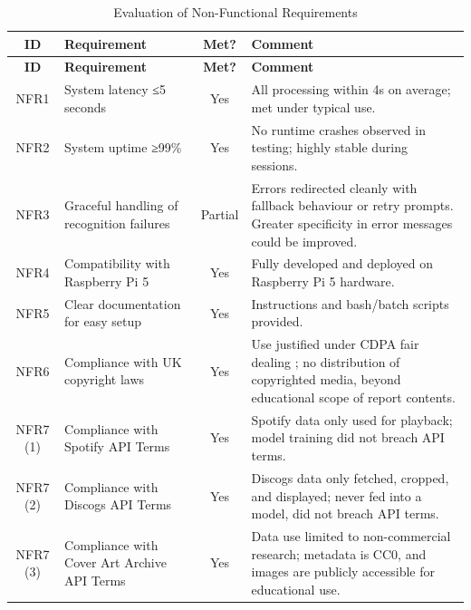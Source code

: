         \begin{longtable}{|c|p{5cm}|c|p{5cm}|}
            \caption{Evaluation of Non-Functional Requirements} \label{tab:NFR}\\
            \hline
            \textbf{ID} & \textbf{Requirement} & \textbf{Met?} & \textbf{Comment} \\
            \hline
            \endfirsthead
            \hline
            \textbf{ID} & \textbf{Requirement} & \textbf{Met?} & \textbf{Comment} \\
            \hline
            \endhead
            NFR1 & System latency ≤5 seconds & Yes & All processing within 4s on average; met under typical use. \\
            \hline
            NFR2 & System uptime ≥99\% & Yes & No runtime crashes observed in testing; highly stable during sessions. \\
            \hline
            NFR3 & Graceful handling of recognition failures & Partial & Errors redirected cleanly with fallback behaviour or retry prompts. Greater specificity in error messages could be improved. \\
            \hline
            NFR4 & Compatibility with Raspberry Pi 5 & Yes & Fully developed and deployed on Raspberry Pi 5 hardware. \\
            \hline
            NFR5 & Clear documentation for easy setup & Yes & Instructions and bash/batch scripts provided. \\
            \hline
            NFR6 & Compliance with UK copyright laws & Yes & Use justified under CDPA fair dealing \cite{cdpa1988}; no distribution of copyrighted media, beyond educational scope of report contents. \\
            \hline
            NFR7 (1) & Compliance with Spotify API Terms & Yes & Spotify data only used for playback; model training did not breach API terms. \cite{spotifyDevPolicy, spotifyDevTerms} \\
            \hline
            NFR7 (2) & Compliance with Discogs API Terms & Yes & Discogs data only fetched, cropped, and displayed; never fed into a model, did not breach API terms. \cite{discogsAPITOU, discogsToS} \\
            \hline
            NFR7 (3) & Compliance with Cover Art Archive API Terms & Yes & Data use limited to non-commercial research; metadata is CC0, and images are publicly accessible for educational use. \cite{coverartArchiveDoc} \\
            \hline
        \end{longtable}
    
